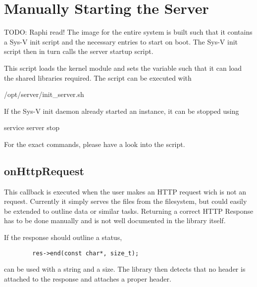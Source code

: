 \section{Manually Starting the Server} %
\label{sec:devguide:server:build}

TODO: Raphi read!
The image for the entire system is built such that it contains a Sys-V init script and the necessary entries to start on boot.
The Sys-V init script then in turn calls the server startup script.

This script loads the kernel module and sets the  variable such that it can load the shared libraries required. The script can be executed with
\begin{commandshell}
    /opt/server/init_server.sh
\end{commandshell}

If the Sys-V init daemon already started an instance, it can be stopped using

\begin{commandshell}
    service server stop
\end{commandshell}

For the exact commands, please have a look into the  script.

\subsection{onHttpRequest} %
\label{subsec:devguide:server:onhttprequest}

This callback  is executed  when the user  makes an HTTP  request wich  is not
an   request. Currently  it  simply serves  the  files from  the
filesystem, but  could easily be  extended to  outline data or  similar tasks.
Returning a  correct HTTP  Response has to  be done manually  and is  not well
documented in the library itself.

If the response should outline a  status,
\begin{tcolorbox}
    \begin{verbatim}
        res->end(const char*, size_t);
    \end{verbatim}
\end{tcolorbox}
\noindent can be used with a string  and a size. The library then detects that
no header  is attached  to the  response and attaches  a proper  
header.

